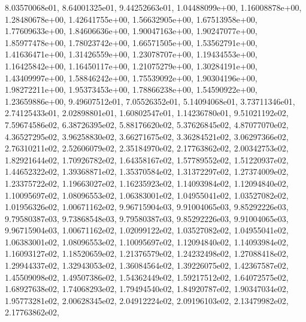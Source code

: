 \documentclass[letterpaper,10pt,english]{sphinxmanual}
\begin{document}
\begin{fulllineitems}
8.03570068e\sphinxhyphen{}01, 8.64001325e\sphinxhyphen{}01, 9.44252663e\sphinxhyphen{}01, 1.04488099e+00, 1.16008878e+00, 1.28480678e+00, 1.42641755e+00, 1.56632905e+00, 1.67513958e+00, 1.77609633e+00, 1.84606636e+00, 1.90047163e+00, 1.90247077e+00, 1.85977478e+00, 1.78023742e+00, 1.66571505e+00, 1.53562791e+00, 1.41636471e+00, 1.31426559e+00, 1.23078707e+00, 1.19434553e+00, 1.16425842e+00, 1.16450117e+00, 1.21075279e+00, 1.30284191e+00, 1.43409997e+00, 1.58846242e+00, 1.75539092e+00, 1.90304196e+00, 1.98272211e+00, 1.95373453e+00, 1.78866238e+00, 1.54590922e+00, 1.23659886e+00, 9.49607512e\sphinxhyphen{}01, 7.05526352e\sphinxhyphen{}01, 5.14094068e\sphinxhyphen{}01, 3.73711346e\sphinxhyphen{}01, 2.74125433e\sphinxhyphen{}01, 2.02898801e\sphinxhyphen{}01, 1.60802547e\sphinxhyphen{}01, 1.14236780e\sphinxhyphen{}01, 9.51021192e\sphinxhyphen{}02, 7.59674586e\sphinxhyphen{}02, 6.38726395e\sphinxhyphen{}02, 5.88176620e\sphinxhyphen{}02, 5.37626845e\sphinxhyphen{}02, 4.87077070e\sphinxhyphen{}02, 4.36527295e\sphinxhyphen{}02, 3.96258830e\sphinxhyphen{}02, 3.66271675e\sphinxhyphen{}02, 3.36284521e\sphinxhyphen{}02, 3.06297366e\sphinxhyphen{}02, 2.76310211e\sphinxhyphen{}02, 2.52606079e\sphinxhyphen{}02, 2.35184970e\sphinxhyphen{}02, 2.17763862e\sphinxhyphen{}02, 2.00342753e\sphinxhyphen{}02, 1.82921644e\sphinxhyphen{}02, 1.70926782e\sphinxhyphen{}02, 1.64358167e\sphinxhyphen{}02, 1.57789552e\sphinxhyphen{}02, 1.51220937e\sphinxhyphen{}02, 1.44652322e\sphinxhyphen{}02, 1.39368871e\sphinxhyphen{}02, 1.35370584e\sphinxhyphen{}02, 1.31372297e\sphinxhyphen{}02, 1.27374009e\sphinxhyphen{}02, 1.23375722e\sphinxhyphen{}02, 1.19663027e\sphinxhyphen{}02, 1.16235923e\sphinxhyphen{}02, 1.14093984e\sphinxhyphen{}02, 1.12094840e\sphinxhyphen{}02, 1.10095697e\sphinxhyphen{}02, 1.08096553e\sphinxhyphen{}02, 1.06383001e\sphinxhyphen{}02, 1.04955041e\sphinxhyphen{}02, 1.03527082e\sphinxhyphen{}02, 1.01956326e\sphinxhyphen{}02, 1.00671162e\sphinxhyphen{}02, 9.96715904e\sphinxhyphen{}03, 9.91004065e\sphinxhyphen{}03, 9.85292226e\sphinxhyphen{}03, 9.79580387e\sphinxhyphen{}03, 9.73868548e\sphinxhyphen{}03, 9.79580387e\sphinxhyphen{}03, 9.85292226e\sphinxhyphen{}03, 9.91004065e\sphinxhyphen{}03, 9.96715904e\sphinxhyphen{}03, 1.00671162e\sphinxhyphen{}02, 1.02099122e\sphinxhyphen{}02, 1.03527082e\sphinxhyphen{}02, 1.04955041e\sphinxhyphen{}02, 1.06383001e\sphinxhyphen{}02, 1.08096553e\sphinxhyphen{}02, 1.10095697e\sphinxhyphen{}02, 1.12094840e\sphinxhyphen{}02, 1.14093984e\sphinxhyphen{}02, 1.16093127e\sphinxhyphen{}02, 1.18520659e\sphinxhyphen{}02, 1.21376579e\sphinxhyphen{}02, 1.24232498e\sphinxhyphen{}02, 1.27088418e\sphinxhyphen{}02, 1.29944337e\sphinxhyphen{}02, 1.32943053e\sphinxhyphen{}02, 1.36084564e\sphinxhyphen{}02, 1.39226075e\sphinxhyphen{}02, 1.42367587e\sphinxhyphen{}02, 1.45509098e\sphinxhyphen{}02, 1.49507386e\sphinxhyphen{}02, 1.54362449e\sphinxhyphen{}02, 1.59217512e\sphinxhyphen{}02, 1.64072575e\sphinxhyphen{}02, 1.68927638e\sphinxhyphen{}02, 1.74068293e\sphinxhyphen{}02, 1.79494540e\sphinxhyphen{}02, 1.84920787e\sphinxhyphen{}02, 1.90347034e\sphinxhyphen{}02, 1.95773281e\sphinxhyphen{}02, 2.00628345e\sphinxhyphen{}02, 2.04912224e\sphinxhyphen{}02, 2.09196103e\sphinxhyphen{}02, 2.13479982e\sphinxhyphen{}02, 2.17763862e\sphinxhyphen{}02, 
\end{fulllineitems}
\end{document}
